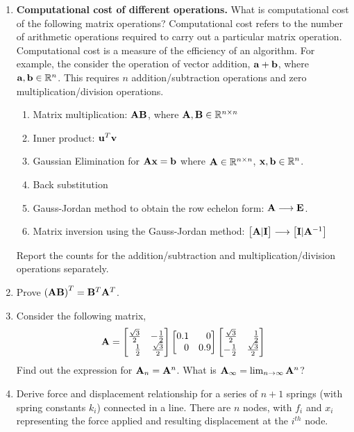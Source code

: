 \begin{enumerate}[resume]
    \item \textbf{Computational cost of different operations.} What is computational cost of the following matrix operations? Computational cost refers to the number of arithmetic operations  required to carry out a particular matrix operation. Computational cost is a measure of the efficiency of an algorithm. For example, the consider the operation of vector addition, $\mathbf{a} + \mathbf{b}$, where $\mathbf{a}, \mathbf{b} \in \mathbb{R}^n$. This requires $n$ addition/subtraction operations and zero multiplication/division operations.
    \begin{enumerate}
        \item Matrix multiplication: $\mathbf{AB}$, where $\mathbf{A}, \mathbf{B} \in \mathbb{R}^{n \times n}$
        \item Inner product: $\mathbf{u}^T\mathbf{v}$
        \item Gaussian Elimination for $\mathbf{A}\mathbf{x} = \mathbf{b}$ where $\mathbf{A} \in \mathbb{R}^{n \times n}$, $\mathbf{x}, \mathbf{b} \in \mathbb{R}^{n}$.
        \item Back substitution
        \item Gauss-Jordan method to obtain the row echelon form: $\mathbf{A} \longrightarrow \mathbf{E}$.
        \item Matrix inversion using the Gauss-Jordan method: $\bmx \mf{A} \vert \mf{I} \emx \longrightarrow \bmx \mf{I}\vert\mf{A}^{-1}\emx$
    \end{enumerate} 
    Report the counts for the addition/subtraction and multiplication/division operations separately. 

    \item Prove $\left( \mathbf{A}\mathbf{B}\right)^T = \mathbf{B}^T\mathbf{A}^T$.

    \item Consider the following matrix,
    \[ \mf{A} = \bmx \frac{\sqrt{3}}{2} & -\frac{1}{2}\\\frac{1}{2} & \frac{\sqrt{3}}{2} \emx \bmx 0.1 & 0\\0 & 0.9 \emx \bmx \frac{\sqrt{3}}{2} & \frac{1}{2}\\-\frac{1}{2} & \frac{\sqrt{3}}{2} \emx \]
    Find out the expression for $\mathbf{A}_n = \mathbf{A}^n$. What is $\mathbf{A}_\infty = \lim_{n\to\infty} \mathbf{A}^n$?

    \item Derive force and displacement relationship for a series of $n+1$ springs (with spring constants $k_i$) connected in a line. There are $n$ nodes, with $f_i$ and $x_i$ representing the force applied and resulting displacement at the $i^{th}$ node. 
    \begin{center}
\end{center}
\end{enumerate}

